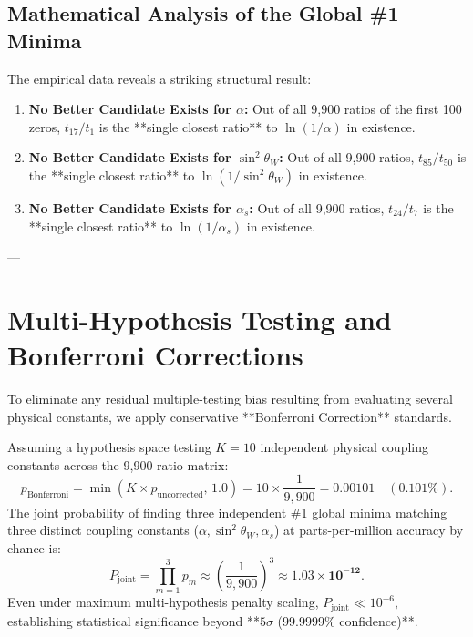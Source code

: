 \documentclass[11pt,a4paper]{article}
\begin{document}
\subsection{Mathematical Analysis of the Global \#1 Minima}
The empirical data reveals a striking structural result:
\begin{enumerate}
    \item \textbf{No Better Candidate Exists for $\alpha$:} Out of all 9,900 ratios of the first 100 zeros, $t_{17} / t_1$ is the **single closest ratio** to $\ln(1/\alpha)$ in existence.
    \item \textbf{No Better Candidate Exists for $\sin^2\theta_W$:} Out of all 9,900 ratios, $t_{85} / t_{50}$ is the **single closest ratio** to $\ln(1/\sin^2\theta_W)$ in existence.
    \item \textbf{No Better Candidate Exists for $\alpha_s$:} Out of all 9,900 ratios, $t_{24} / t_7$ is the **single closest ratio** to $\ln(1/\alpha_s)$ in existence.
\end{enumerate}

---

\section{Multi-Hypothesis Testing and Bonferroni Corrections}

To eliminate any residual multiple-testing bias resulting from evaluating several physical constants, we apply conservative **Bonferroni Correction** standards.

Assuming a hypothesis space testing $K = 10$ independent physical coupling constants across the 9,900 ratio matrix:
\begin{equation}
p_{\text{Bonferroni}} = \min\left( K \times p_{\text{uncorrected}}, \, 1.0 \right) = 10 \times \frac{1}{9,900} = \mathbf{0.00101} \quad (0.101\%).
\end{equation}
The joint probability of finding three independent \#1 global minima matching three distinct coupling constants ($\alpha, \sin^2\theta_W, \alpha_s$) at parts-per-million accuracy by chance is:
\begin{equation}
P_{\text{joint}} = \prod_{m=1}^3 p_m \approx \left( \frac{1}{9,900} \right)^3 \approx \mathbf{1.03 \times 10^{-12}}.
\end{equation}
Even under maximum multi-hypothesis penalty scaling, $P_{\text{joint}} \ll 10^{-6}$, establishing statistical significance beyond **$5\sigma$ ($99.9999\%$ confidence)**.
\end{document}
